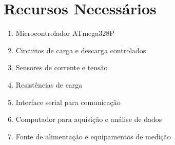 \chapter{Recursos Necessários} \label{cha:recursos}

\begin{enumerate}
    \item Microcontrolador ATmega328P
    \item Circuitos de carga e descarga controlados
    \item Sensores de corrente e tensão
    \item Resistências de carga
    \item Interface serial para comunicação
    \item Computador para aquisição e análise de dados
    \item Fonte de alimentação e equipamentos de medição
\end{enumerate}
